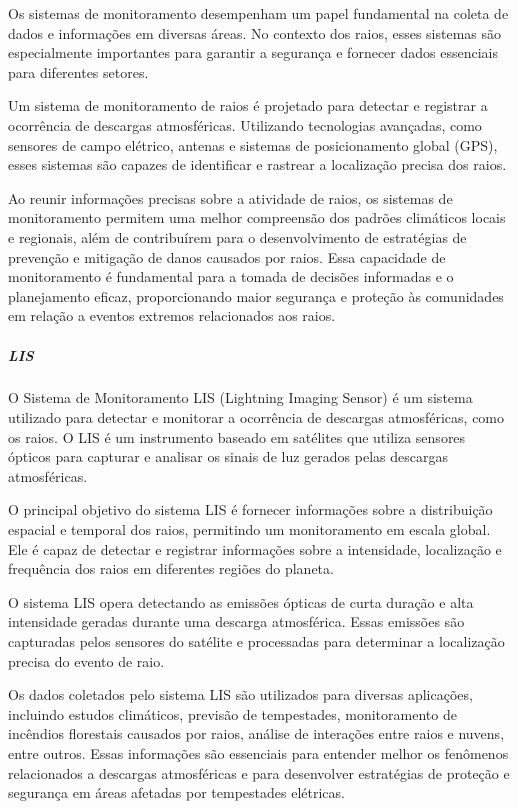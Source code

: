 \documentclass[a4paper, 12pt, onecolumn,singlespacing]{article}
\begin{document}
	Os sistemas de monitoramento desempenham um papel fundamental na coleta de dados e informações em diversas áreas. No contexto dos raios, esses sistemas são especialmente importantes para garantir a segurança e fornecer dados essenciais para diferentes setores.
	
	Um sistema de monitoramento de raios é projetado para detectar e registrar a ocorrência de descargas atmosféricas. Utilizando tecnologias avançadas, como sensores de campo elétrico, antenas e sistemas de posicionamento global (GPS), esses sistemas são capazes de identificar e rastrear a localização precisa dos raios.
	
	Ao reunir informações precisas sobre a atividade de raios, os sistemas de monitoramento permitem uma melhor compreensão dos padrões climáticos locais e regionais, além de contribuírem para o desenvolvimento de estratégias de prevenção e mitigação de danos causados por raios. Essa capacidade de monitoramento é fundamental para a tomada de decisões informadas e o planejamento eficaz, proporcionando maior segurança e proteção às comunidades em relação a eventos extremos relacionados aos raios.
	
	\subparagraph{LIS}
	O Sistema de Monitoramento LIS (Lightning Imaging Sensor) é um sistema utilizado para detectar e monitorar a ocorrência de descargas atmosféricas, como os raios. O LIS é um instrumento baseado em satélites que utiliza sensores ópticos para capturar e analisar os sinais de luz gerados pelas descargas atmosféricas.
	
	O principal objetivo do sistema LIS é fornecer informações sobre a distribuição espacial e temporal dos raios, permitindo um monitoramento em escala global. Ele é capaz de detectar e registrar informações sobre a intensidade, localização e frequência dos raios em diferentes regiões do planeta.
	
	O sistema LIS opera detectando as emissões ópticas de curta duração e alta intensidade geradas durante uma descarga atmosférica. Essas emissões são capturadas pelos sensores do satélite e processadas para determinar a localização precisa do evento de raio.
	
	Os dados coletados pelo sistema LIS são utilizados para diversas aplicações, incluindo estudos climáticos, previsão de tempestades, monitoramento de incêndios florestais causados por raios, análise de interações entre raios e nuvens, entre outros. Essas informações são essenciais para entender melhor os fenômenos relacionados a descargas atmosféricas e para desenvolver estratégias de proteção e segurança em áreas afetadas por tempestades elétricas.
	
\end{document}
